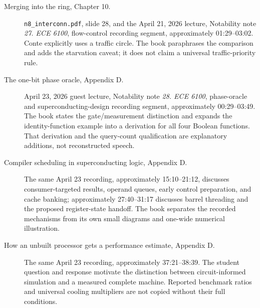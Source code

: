 \begin{description}
  \item[Merging into the ring, Chapter 10.] \texttt{n8\_interconn.pdf}, slide 28, and the April 21, 2026 lecture, Notability note \emph{27. ECE 6100}, flow-control recording segment, approximately 01:29--03:02. Conte explicitly uses a traffic circle. The book paraphrases the comparison and adds the starvation caveat; it does not claim a universal traffic-priority rule.
  \item[The one-bit phase oracle, Appendix D.] April 23, 2026 guest lecture, Notability note \emph{28. ECE 6100}, phase-oracle and superconducting-design recording segment, approximately 00:29--03:49. The book states the gate/measurement distinction and expands the identity-function example into a derivation for all four Boolean functions. That derivation and the query-count qualification are explanatory additions, not reconstructed speech.
  \item[Compiler scheduling in superconducting logic, Appendix D.] The same April 23 recording, approximately 15:10--21:12, discusses consumer-targeted results, operand queues, early control preparation, and cache banking; approximately 27:40--31:17 discusses barrel threading and the proposed register-state handoff. The book separates the recorded mechanisms from its own small diagrams and one-wide numerical illustration.
  \item[How an unbuilt processor gets a performance estimate, Appendix D.] The same April 23 recording, approximately 37:21--38:39. The student question and response motivate the distinction between circuit-informed simulation and a measured complete machine. Reported benchmark ratios and universal cooling multipliers are not copied without their full conditions.
\end{description}

